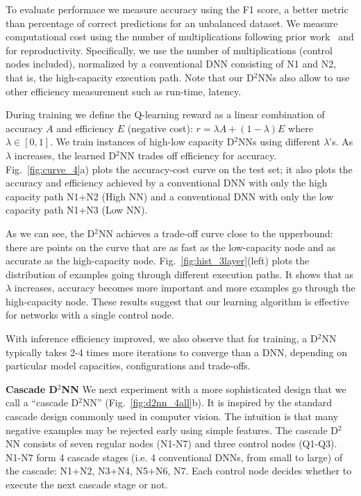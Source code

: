 \documentclass[10pt,twocolumn,letterpaper]{article}
\newcommand{\smallparagraph}[1]{\smallskip \noindent \textbf{#1}}
\begin{document}
To evaluate performace we measure accuracy using the F1 score,
a better metric than percentage of correct predictions for an unbalanced
dataset. 
We measure computational cost using the number of multiplications following prior work~\cite{DBLP:conf/icml/AlmahairiBCZLC16,shazeer2017outrageously} 
and for reproductivity. Specifically, we use the number of multiplications (control
nodes included), normalized by a conventional DNN consisting
of N1 and N2, that is, the high-capacity execution path. Note that our D$^2$NNs also allow
to use other efficiency measurement such as run-time, latency.

During training we define the Q-learning reward as a linear combination of accuracy $A$ and
efficiency $E$ (negative cost): $r = \lambda A + (1-\lambda) E$ where
$\lambda\in [0,1]$. We train instances of high-low capacity D$^2$NNs using different
$\lambda$'s. As $\lambda$ increases, the learned D$^2$NN trades off efficiency for
accuracy. Fig.~\ref{fig:curve_4}a) plots the accuracy-cost curve on the test
set; it also plots the accuracy and efficiency achieved by a conventional DNN with only
the high capacity path N1+N2 (High NN) and a conventional DNN with only the low capacity path
N1+N3 (Low NN). 

As we can see, the D$^2$NN achieves a trade-off curve close to the
upperbound: there are points on the curve that are as fast as the low-capacity node and as
accurate as the high-capacity node.  Fig.~\ref{fig:hist_3layer}(left) plots the distribution of examples going through different
execution paths. It shows that as $\lambda$ increases, accuracy becomes more important and
more examples go through the high-capacity node. These results suggest that our 
learning algorithm is effective for networks with a single control node. 

With inference efficiency improved, we also observe that for training, a D$^2$NN typically takes 2-4 times more iterations to converge than a DNN, depending on particular model capacities, configurations and trade-offs. 

\smallparagraph{Cascade D$^2$NN}
We next experiment with a more sophisticated design that we call a ``cascade
D$^2$NN'' (Fig.~\ref{fig:d2nn_4all}b). It is inspired by the standard cascade design commonly used in computer vision. The intuition is
that many negative examples may be rejected early using simple features. The cascade D$^2$NN consists of seven regular
nodes (N1-N7) and three control nodes (Q1-Q3). N1-N7 form 4 cascade stages (i.e. 4 conventional DNNs, from small to large) of the cascade: N1+N2, N3+N4, N5+N6, N7. Each control node decides whether to
execute the next cascade stage or not. 
\end{document}
